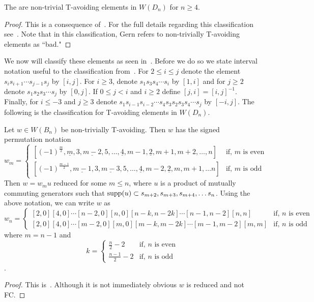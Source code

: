 \begin{theorem}
 The are non-trivial T-avoiding elements in $W(D_n)$ for $n \geq 4$.
\begin{proof}
	This is a consequence of~\cite[Section 2.2]{Gern2013a}. For the full details regarding this classification see~\cite{Gern2013a}. Note that in this classification, Gern  refers to non-trivially T-avoiding elements as ``bad."
\end{proof}
\end{theorem}

We now will classify these elements as seen in~\cite{Gern2013a}. Before we do so we state interval notation useful to the classification from~\cite[Definition 2.3.1]{Gern2013a}. For $2 \leq i \leq j$ denote the element $s_{i}s_{i+1} \cdots s_{j-1}s_j$ by $[i,j]$. For $i \geq 3$, denote $s_1s_3s_4\cdots s_i$ by $[1,i]$ and for $j \geq 2$ denote $s_1s_2s_3 \cdots s_j$ by $[0,j]$. If $0 \leq j <i$ and $i \geq 2$ define $[j,i]=[i,j]^{-1}$. Finally, for $i \leq -3$ and $j \geq 3$ denote $s_1s_{i-1}s_{i-2} \cdots s_4s_3s_2s_3s_4 \cdots s_j$ by $[-i,j]$. The following is the classification for T-avoiding elements in $W(D_n)$. 

\begin{proposition}
	Let $w \in W(B_n)$ be non-trivially T-avoiding. Then $w$ has the signed permutation notation 
	\[ w_m= \begin{cases}
 			[(-1)^{\frac{m}{2}},\underline{m},3, \underline{m-2}, 5, \ldots, \underline{4}, m-1, \underline{2}, m+1, m+2, \ldots, n] & \text{if, $m$ is even} \\
 			[(-1)^{\frac{m-1}{2}}, \underline{m-1}, 3, \underline{m-3}, 5, \ldots, \underline{4}, m-2, \underline{2}, m, m+1, \ldots n] & \text{if, $m$ is odd}	
 \end{cases}
\]
Then $w=w_mu$ reduced for some $m \leq n$, where $u$ is a product of mutually commuting generators such that $\mathrm{supp}(u) \subset{s_{m+2}, s_{m+3}, s_{m+4}, \ldots s_n}$. Using the above notation, we can write $w$ as 
\[ w_n=
\begin{cases}
	[2,0][4,0] \cdots [n-2,0][n,0][n-k,n-2k] \cdots [n-1,n-2][n,n] & \text{if, $n$ is even}\\
	[2,0][4,0] \cdots [m-2,0][m,0][m-k,m-2k] \cdots [m-1,m-2][m,m] & \text{if, $n$ is odd}
\end{cases}
\] where $m=n-1$ and 
\[
k= 
\begin{cases}
\frac{n}{2}-2 & \text{if, $n$ is even}\\
\frac{n-1}{2}-2 & \text{if, $n$ is odd}
\end{cases}
\].
\begin{proof}
	This is~\cite[Lemmas 2.2.18 and 2.3.4]{Gern2013a}. Although it is not immediately obvious $w$ is reduced and not FC.
\end{proof}
\end{proposition}

